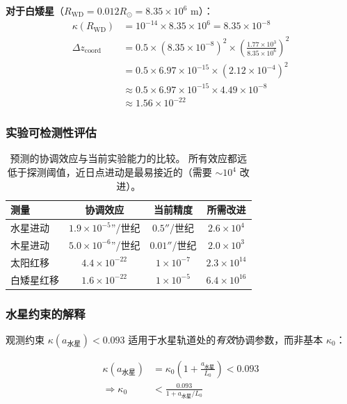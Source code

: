 \documentclass[11pt,a4paper]{article}
\begin{document}
	\textbf{对于白矮星}（$R_{\text{WD}} = 0.012 R_\odot = 8.35 \times 10^6$ m）：
	\begin{align}
		\kappa(R_{\text{WD}}) &= 10^{-14} \times 8.35 \times 10^6 = 8.35 \times 10^{-8} \\
		\Delta z_{\text{coord}} &= 0.5 \times (8.35 \times 10^{-8})^2 \times \left(\frac{1.77 \times 10^3}{8.35 \times 10^6}\right)^2 \\
		&= 0.5 \times 6.97 \times 10^{-15} \times (2.12 \times 10^{-4})^2 \\
		&\approx 0.5 \times 6.97 \times 10^{-15} \times 4.49 \times 10^{-8} \\
		&\approx 1.56 \times 10^{-22}
	\end{align}
	
	\subsubsection{实验可检测性评估}
	
	\begin{table}[htbp]
		\centering
		\begin{tabular}{lccc}
			\toprule
			\textbf{测量} & \textbf{协调效应} & \textbf{当前精度} & \textbf{所需改进} \\
			\midrule
			水星进动 & $1.9 \times 10^{-5}$''/世纪 & $0.5''$/世纪 & $2.6 \times 10^4$ \\
			木星进动 & $5.0 \times 10^{-6}$''/世纪 & $0.01''$/世纪 & $2.0 \times 10^3$ \\
			太阳红移 & $4.4 \times 10^{-22}$ & $1 \times 10^{-7}$ & $2.3 \times 10^{14}$ \\
			白矮星红移 & $1.6 \times 10^{-22}$ & $1 \times 10^{-5}$ & $6.4 \times 10^{16}$ \\
			\bottomrule
		\end{tabular}
		\caption{预测的协调效应与当前实验能力的比较。
			所有效应都远低于探测阈值，近日点进动是最易接近的（需要 $\sim 10^4$ 改进）。}
	\end{table}
	
	\subsubsection{水星约束的解释}
	
	观测约束 $\kappa(a_{\text{水星}}) < 0.093$ 适用于水星轨道处的\textit{有效}协调参数，而非基本 $\kappa_0$：
	
	\begin{align}
		\kappa(a_{\text{水星}}) &= \kappa_0 \left(1 + \frac{a_{\text{水星}}}{L_0}\right) < 0.093 \\
		\Rightarrow \kappa_0 &< \frac{0.093}{1 + a_{\text{水星}}/L_0}
	\end{align}
	
\end{document}
